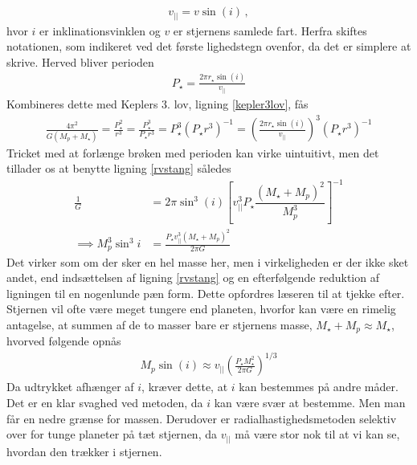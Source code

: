 \begin{align}
    v_{||} = v \sin(i) \, ,
\end{align}
hvor $i$ er inklinationsvinklen og $v$ er stjernens samlede fart. Herfra skiftes notationen, som indikeret ved det første lighedstegn ovenfor, da det er simplere at skrive. %
Herved bliver perioden
\begin{align}
    P_\star  = \frac{2\pi r_\star \sin(i)}{v_{||}} 
\end{align}
Kombineres dette med Keplers 3. lov, ligning \eqref{kepler3lov}, fås
\begin{align} \label{eq:K3Fancy}
    \frac{4\pi^2}{G(M_p+M_\star )} = \frac{P_\star ^2}{r ^3} = \frac{P_\star ^3}{P_\star r ^3} = P_\star ^3 (P_\star r ^3)^{-1} = \left(\frac{2\pi r_\star \sin(i)}{v_{||}}\right)^3\left(P_\star r^3\right)^{-1}
\end{align}
Tricket med at forlænge brøken med perioden kan virke uintuitivt, men det tillader os at benytte ligning \eqref{rvstang} således
\begin{equation} \label{eq:m_planet}
\begin{aligned}
    \frac{1}{G} &= 2\pi\sin^3(i)\left[v_{||}^3P_\star \dfrac{(M_\star +M_p)^2}{M_p^3}\right]^{-1} \\
    \implies M_p^3\sin^3i &= \frac{P_\star v_{||}^3(M_\star +M_p)^2}{2\pi G}
\end{aligned}
\end{equation}
Det virker som om der sker en hel masse her, men i virkeligheden er der ikke sket andet, end indsættelsen af ligning \eqref{rvstang} og en efterfølgende reduktion af ligningen til en nogenlunde pæn form. Dette opfordres læseren til at tjekke efter. \\
Stjernen vil ofte være meget tungere end planeten, hvorfor kan være en rimelig antagelse, at summen af de to masser bare er stjernens masse, $M_\star  + M_p\approx M_\star $, hvorved følgende opnås
\begin{align}
    M_p\sin(i) \approx v_{||}\left(\frac{P_\star M_\star ^2}{2\pi G}\right)^{1/3}
\end{align}
Da udtrykket afhænger af $i$, kræver dette, at $i$ kan bestemmes på andre måder. Det er en klar svaghed ved metoden, da $i$ kan være svær at bestemme. Men man får en nedre grænse for massen. Derudover er radialhastighedsmetoden selektiv over for tunge planeter på tæt stjernen, da $v_{||}$ må være stor nok til at vi kan se, hvordan den trækker i stjernen.

